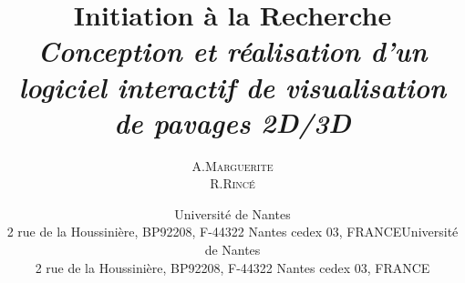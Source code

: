 \documentclass[11pt,a4paper,utf8x]{report}
\title{ \huge{Initiation à la Recherche \vspace{3cm} } \\ \emph{Conception et réalisation d’un logiciel interactif de visualisation de pavages 2D/3D }%
}
\author{A.\textsc{Marguerite}\\ R.\textsc{Rincé}\vspace{3cm}}
\date{Université de Nantes \\ 2 rue de la Houssinière, BP92208, F-44322 Nantes cedex 03, FRANCE}
\date{Université de Nantes \\ 2 rue de la Houssinière, BP92208, F-44322 Nantes cedex 03, FRANCE}
\begin{document}
\maketitle
\renewcommand{\labelitemi}{$\bullet$} 

\clearpage

\tableofcontents
\clearpage










\listoffigures


\end{document}
